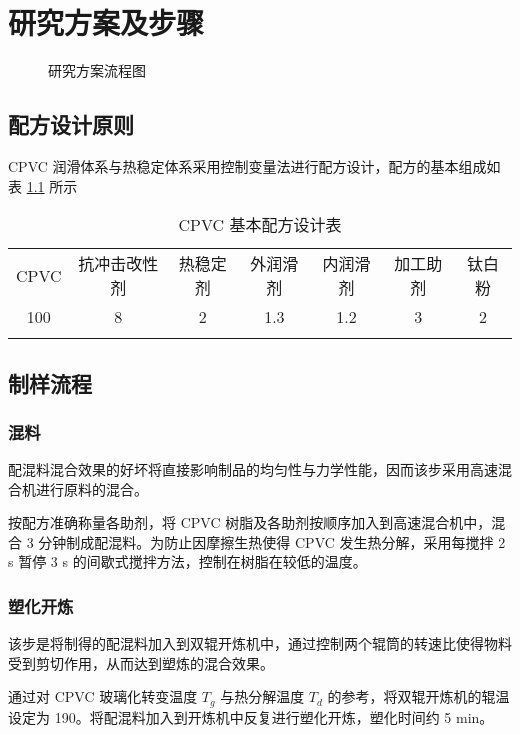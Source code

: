 \chapter{研究方案及步骤}

\begin{figure}[!htbp]
    \begin{center}
        
    \end{center}
    \caption{研究方案流程图}
\end{figure}

\section{配方设计原则}
CPVC 润滑体系与热稳定体系采用控制变量法进行配方设计，配方的基本组成如表 \ref{tabCPVCFormula} 所示

\begin{table}[!htbp]
    \caption{CPVC 基本配方设计表}
    \label{tabCPVCFormula}
    \begin{center}
    \footnotesize{
        \begin{tabular}{ccccccc}
            \Xhline{1pt}
            CPVC & 抗冲击改性剂 & 热稳定剂 & 外润滑剂 & 内润滑剂 & 加工助剂 & 钛白粉 \\
            \Xhline{0.5pt}
            100\footnotemark[1] & 8 & 2 & 1.3 & 1.2 & 3 & 2   \\
            \Xhline{1pt}
        \end{tabular}
    }
    \end{center}
\end{table}

\section{制样流程}

\subsection{混料}
配混料混合效果的好坏将直接影响制品的均匀性与力学性能，因而该步采用高速混合机进行原料的混合。\par
按配方准确称量各助剂，将 CPVC 树脂及各助剂按顺序加入到高速混合机中，混合 3 分钟制成配混料。为防止因摩擦生热使得 CPVC 发生热分解，采用每搅拌 2 s 暂停 3 s 的间歇式搅拌方法，控制在树脂在较低的温度。

\subsection{塑化开炼}
该步是将制得的配混料加入到双辊开炼机中，通过控制两个辊筒的转速比使得物料受到剪切作用，从而达到塑炼的混合效果。\par
通过对 CPVC 玻璃化转变温度 $T_g$ 与热分解温度 $T_d$ 的参考，将双辊开炼机的辊温设定为 190\cd。将配混料加入到开炼机中反复进行塑化开炼，塑化时间约 5 min。

